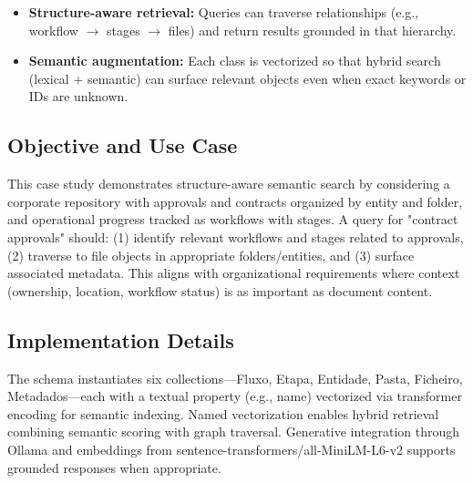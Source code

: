 \begin{itemize}
    \item \textbf{Structure-aware retrieval:} Queries can traverse relationships (e.g., workflow \(\rightarrow\) stages \(\rightarrow\) files) and return results grounded in that hierarchy.
    \item \textbf{Semantic augmentation:} Each class is vectorized so that hybrid search (lexical + semantic) can surface relevant objects even when exact keywords or IDs are unknown.
\end{itemize}

\subsection{Objective and Use Case}

This case study demonstrates structure-aware semantic search by considering a corporate repository with approvals and contracts organized by entity and folder, and operational progress tracked as workflows with stages. A query for "contract approvals" should: (1) identify relevant workflows and stages related to approvals, (2) traverse to file objects in appropriate folders/entities, and (3) surface associated metadata. This aligns with organizational requirements where context (ownership, location, workflow status) is as important as document content.

\subsection{Implementation Details}

The schema instantiates six collections—Fluxo, Etapa, Entidade, Pasta, Ficheiro, Metadados—each with a textual property (e.g., name) vectorized via transformer encoding for semantic indexing. Named vectorization enables hybrid retrieval combining semantic scoring with graph traversal. Generative integration through Ollama and embeddings from sentence-transformers/all-MiniLM-L6-v2 supports grounded responses when appropriate.

